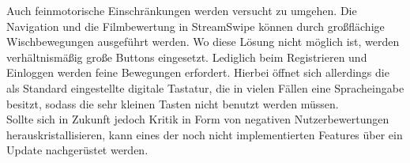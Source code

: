 Auch feinmotorische Einschränkungen werden versucht zu umgehen. Die Navigation und die Filmbewertung in StreamSwipe können durch großflächige Wischbewegungen ausgeführt werden. Wo diese Lösung nicht möglich ist, werden verhältnismäßig große Buttons eingesetzt. Lediglich beim Registrieren und Einloggen werden feine Bewegungen erfordert. Hierbei öffnet sich allerdings die als Standard eingestellte digitale Tastatur, die in vielen Fällen eine Spracheingabe besitzt, sodass die sehr kleinen Tasten nicht benutzt werden müssen.\\


Sollte sich in Zukunft jedoch Kritik in Form von negativen Nutzerbewertungen herauskristallisieren, kann eines der noch nicht implementierten Features über ein Update nachgerüstet werden.